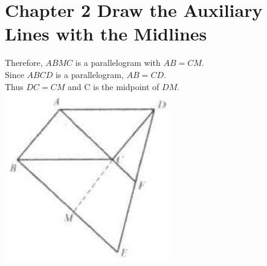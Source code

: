 \documentclass[10pt]{article}
\begin{document}
\section*{Chapter 2 Draw the Auxiliary Lines with the Midlines}
Therefore, \(A B M C\) is a parallelogram with \(A B=C M\).\\
Since \(A B C D\) is a parallelogram, \(A B=C D\).\\
Thus \(D C=C M\) and C is the midpoint of \(D M\).\\
\includegraphics[max width=\textwidth, center]{2025_04_17_97bc1f7e44d93c271a88g-038(1)}
\end{document}
